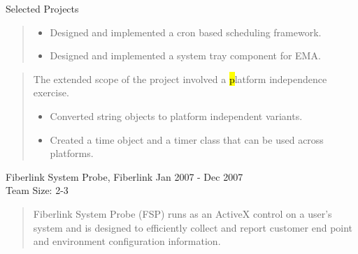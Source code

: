 \documentclass{resume}
\newcommand{\teamsize}{\\\sc\footnotesize Team Size: }
\begin{document}
\begin{category}{Selected Projects}{}
\begin{quote}
            \begin{itemize}
                \item Designed and implemented a cron based scheduling framework.
                \item Designed and implemented a system tray component for EMA.
            \end{itemize}
        \end{quote}
        \begin{quote}
            The extended scope of the project involved a {\hl platform
            independence} exercise.

            \begin{itemize}
                \item Converted string objects to platform independent
                    variants.
                \item Created a time object and a timer class that can be used across platforms.
            \end{itemize}
        \end{quote}

    \pagebreak

    \item {\topic Fiberlink System Probe,} Fiberlink
        {\period Jan 2007 - Dec 2007}
        {\teamsize 2-3}
        \begin{quote}
            Fiberlink System Probe (FSP) runs as an ActiveX control on a
            user's system and is designed to efficiently collect and report
            customer end point and environment configuration information.


\end{quote}
\end{category}
\end{document}
